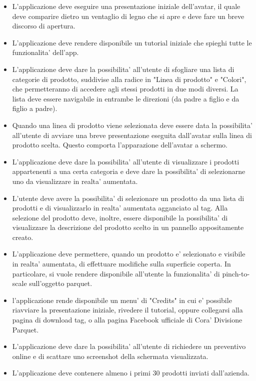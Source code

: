 \begin{itemize}
	
	\item L'applicazione deve eseguire una presentazione iniziale dell'avatar, il quale deve comparire dietro un ventaglio di legno che si apre e deve fare un breve discorso di apertura.
	
	\item L'applicazione deve rendere disponibile un tutorial iniziale che spieghi tutte le funzionalita' dell'app.
	
	\item L'applicazione deve dare la possibilita' all'utente di sfogliare una lista di categorie di prodotto, suddivise alla radice in  "Linea di prodotto" e "Colori", che permetteranno di accedere agli stessi prodotti in due modi diversi. La lista deve essere navigabile in entrambe le direzioni (da padre a figlio e da figlio a padre).
	
	\item Quando una linea di prodotto viene selezionata deve essere data la possibilita' all'utente di avviare una breve presentazione eseguita dall'avatar sulla linea di prodotto scelta. Questo comporta l'apparazione dell'avatar a schermo.
	
	\item L'applicazione deve dare la possibilita' all'utente di visualizzare i prodotti appartenenti a una certa categoria e deve dare la possibilita' di selezionarne uno da visualizzare in realta' aumentata.
	
	\item L'utente deve avere la possibilita' di selezionare un prodotto da una lista di prodotti e di visualizzarlo in realta' aumentata agganciato al tag. Alla selezione del prodotto deve, inoltre, essere disponibile la possibilita' di visualizzare la descrizione del prodotto scelto in un pannello appositamente creato.
	
	\item L'applicazione deve permettere, quando un prodotto e' selezionato e visibile in realta' aumentata, di effettuare modifiche sulla superficie coperta. In particolare, si vuole rendere disponibile all'utente la funzionalita' di pinch-to-scale sull'oggetto parquet.
	
	\item l'applicazione rende disponibile un menu' di "Credits" in cui e' possibile riavviare la presentazione iniziale, rivedere il tutorial, oppure collegarsi alla pagina di download tag, o alla pagina Facebook ufficiale di Cora' Divisione Parquet.
	
	\item L'applicazione deve dare la possibilita' all'utente di richiedere un preventivo online e di scattare uno screenshot della schermata visualizzata.
	
	\item L'applicazione deve contenere almeno i primi 30 prodotti inviati dall'azienda. 
	
\end{itemize}

